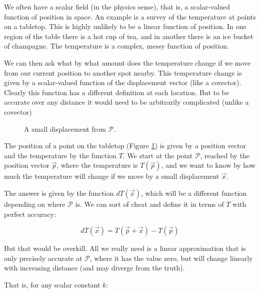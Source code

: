 We often have a scalar field (in the physics sense), that is, a scalar-valued function of position in space. An example is a survey of the temperature at points on a tabletop. This is highly unlikely to be a linear function of position. In one region of the table there is a hot cup of tea, and in another there is an ice bucket of champagne. The temperature is a complex, messy function of position.

We can then ask what by what amount does the temperature change if we move from our current position to another spot nearby. This temperature change is given by a scalar-valued function of the displacement vector (like a covector). Clearly this function has a different definition at each location. But to be accurate over any distance it would need to be arbitrarily complicated (unlike a covector)

\begin{figure}[h]
    \centering
    \caption{A small displacement from $\mathcal{P}$.} \label{fig:vector-displacement}
\end{figure}

The position of a point on the tabletop (Figure \ref{fig:vector-displacement}) is given by a position vector and the temperature by the function $T$. We start at the point $\mathcal{P}$, reached by the position vector $\vec{p}$, where the temperature is $T(\vec{p})$, and we want to know by how much the temperature will change if we move by a small displacement $\vec{x}$.

The answer is given by the function $dT(\vec{x})$, which will be a different function depending on where $\mathcal{P}$ is. We can sort of cheat and define it in terms of $T$ with perfect accuracy:

$$
dT(\vec{x}) = T(\vec{p} + \vec{x}) - T(\vec{p})
$$

But that would be overkill. All we really need is a linear approximation that is only precisely accurate at $\mathcal{P}$, where it has the value zero, but will change linearly with increasing distance (and may diverge from the truth). 

That is, for any scalar constant $k$:

